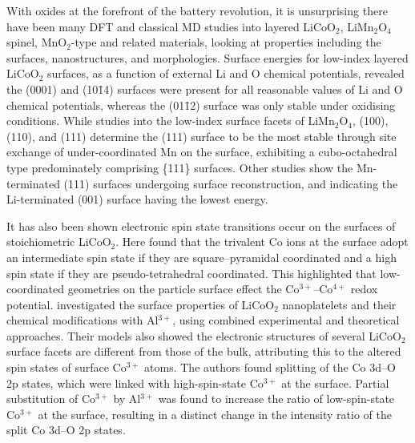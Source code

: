 \documentclass[../main.tex]{subfiles}
\begin{document}
With oxides at the forefront of the battery revolution, it is unsurprising there have been many DFT and classical MD studies into layered LiCoO$_2$, LiMn$_2$O$_4$ spinel, MnO$_2$-type and related materials, looking at properties including the surfaces, nanostructures, and morphologies.\cite{kramer2009tailoring,xu2011identifying, daheron2009surface,kim2012first,benedek2011simulation,karim2013surface,leung2012first, tompsett2013nanostructuring} Surface energies for low-index layered LiCoO$_2$ surfaces, as a function of external Li and O chemical potentials, revealed the (0001) and (10\={1}4) surfaces were present for all reasonable values of Li and O chemical potentials, whereas the (01\={1}2) surface was only stable under oxidising conditions. \cite{kramer2009tailoring} While studies into the low-index surface facets of LiMn$_2$O$_4$, (100),(110), and (111) determine the (111) surface to be the most stable through site exchange of under-coordinated Mn on the surface, exhibiting a cubo-octahedral type predominately comprising \{111\} surfaces. \cite{karim2013surface} Other studies show the Mn-terminated (111) surfaces undergoing surface reconstruction, and indicating the Li-terminated (001) surface having the lowest energy. \cite{benedek2011simulation}

It has also been shown electronic spin state transitions occur on the surfaces of stoichiometric LiCoO$_2$. Here \citeauthor{qian2012electronic} found that the trivalent Co ions at the surface adopt an intermediate spin state if they are square–pyramidal coordinated and a high spin state if they are pseudo-tetrahedral coordinated. This highlighted that low-coordinated geometries on the particle surface effect the Co$^{3+}$–Co$^{4+}$ redox potential. \cite{qian2012electronic} \citeauthor{hong2019electronic} investigated the surface properties of LiCoO$_2$ nanoplatelets and their chemical modifications with Al$^{3+}$, using combined experimental and theoretical approaches.\cite{hong2019electronic} Their models also showed the electronic structures of several LiCoO$_2$ surface facets are different from those of the bulk, attributing this to the altered spin states of surface Co$^{3+}$ atoms. The authors found splitting of the Co 3d–O 2p states, which were linked with high-spin-state Co$^{3+}$ at the surface. Partial substitution of Co$^{3+}$ by Al$^{3+}$ was found to increase the ratio of low-spin-state Co$^{3+}$ at the surface, resulting in a distinct change in the intensity ratio of the split Co 3d–O 2p states. 
\end{document}
